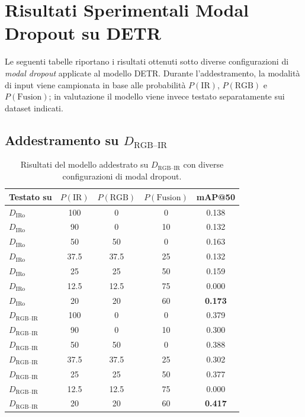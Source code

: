 \documentclass[a4paper,11pt]{article}
\begin{document}
\section{Risultati Sperimentali Modal Dropout su DETR}

Le seguenti tabelle riportano i risultati ottenuti sotto diverse configurazioni di \emph{modal dropout} applicate al modello DETR.
Durante l'addestramento, la modalità di input viene campionata in base alle probabilità $P(\text{IR})$, $P(\text{RGB})$ e $P(\text{Fusion})$; in valutazione il modello viene invece testato separatamente sui dataset indicati.

\subsection{Addestramento su $D_{\text{RGB--IR}}$}

\begin{table}[h]
\centering
\caption{Risultati del modello addestrato su $D_{\text{RGB--IR}}$ con diverse configurazioni di modal dropout.}
\label{tab:rgbir_train}
\begin{tabular}{lcccc}
\toprule
Testato su & $P(\text{IR})$ & $P(\text{RGB})$ & $P(\text{Fusion})$ & mAP@50 \\
\midrule
$D_{\text{IRo}}$ & 100 & 0 & 0 & 0.138 \\
$D_{\text{IRo}}$ & 90 & 0 & 10 & 0.132 \\
$D_{\text{IRo}}$ & 50 & 50 & 0 & 0.163 \\
$D_{\text{IRo}}$ & 37.5 & 37.5 & 25 & 0.132 \\
$D_{\text{IRo}}$ & 25 & 25 & 50 & 0.159 \\
$D_{\text{IRo}}$ & 12.5 & 12.5 & 75 & 0.000 \\
$D_{\text{IRo}}$ & 20 & 20 & 60 & \textbf{0.173} \\
\midrule
$D_{\text{RGB--IR}}$ & 100 & 0 & 0 & 0.379 \\
$D_{\text{RGB--IR}}$ & 90 & 0 & 10 & 0.300 \\
$D_{\text{RGB--IR}}$ & 50 & 50 & 0 & 0.388 \\
$D_{\text{RGB--IR}}$ & 37.5 & 37.5 & 25 & 0.302 \\
$D_{\text{RGB--IR}}$ & 25 & 25 & 50 & 0.377 \\
$D_{\text{RGB--IR}}$ & 12.5 & 12.5 & 75 & 0.000 \\
$D_{\text{RGB--IR}}$ & 20 & 20 & 60 & \textbf{0.417} \\
\bottomrule
\end{tabular}
\end{table}
\end{document}
